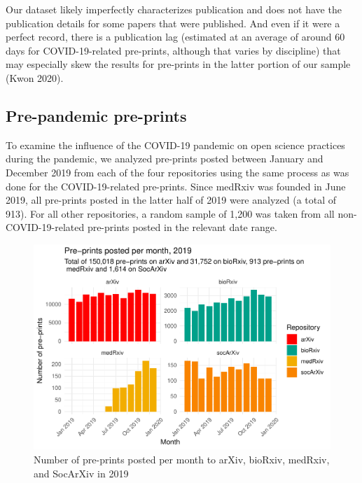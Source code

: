 \documentclass[
]{article}
\begin{document}
Our dataset likely imperfectly characterizes publication and does not have the publication details for some papers that were published. And even if it were a perfect record, there is a publication lag (estimated at an average of around 60 days for COVID-19-related pre-prints, although that varies by discipline) that may especially skew the results for pre-prints in the latter portion of our sample (Kwon 2020).

\hypertarget{pre-pandemic-pre-prints}{%
\subsection{Pre-pandemic pre-prints}\label{pre-pandemic-pre-prints}}

To examine the influence of the COVID-19 pandemic on open science practices during the pandemic, we analyzed pre-prints posted between January and December 2019 from each of the four repositories using the same process as was done for the COVID-19-related pre-prints. Since medRxiv was founded in June 2019, all pre-prints posted in the latter half of 2019 were analyzed (a total of 913). For all other repositories, a random sample of 1,200 was taken from all non-COVID-19-related pre-prints posted in the relevant date range.

\begin{figure}

{\centering \includegraphics[width=0.9\linewidth]{paper_files/figure-latex/2019-results-med-arxiv-1} 

}

\caption{Number of pre-prints posted per month to arXiv, bioRxiv, medRxiv, and SocArXiv in 2019}\label{fig:2019-results-med-arxiv}
\end{figure}
\end{document}
